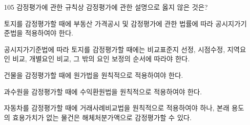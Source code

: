 \begin{question}{105}
감정평가에 관한 규칙상 감정평가에 관한 설명으로 옳지 않은 것은?
\begin{choices}
  \item 토지를 감정평가할 때에 부동산 가격공시 및 감정평가에 관한 법률에 따라 공시지가기준법을 적용하여야 한다.
  \item 공시지가기준법에 따라 토지를 감정평가할 때에는 비교표준지 선정, 시점수정, 지역요인 비교, 개별요인 비교, 그 밖의 요인 보정의 순서에 따라야 한다.
  \item 건물을 감정평가할 때에 원가법을 원칙적으로 적용하여야 한다.
  \item 과수원을 감정평가할 때에 수익환원법을 원칙적으로 적용하여야 한다.
  \item 자동차를 감정평가할 때에 거래사례비교법을 원칙적으로 적용하여야 하나, 본래 용도의 효용가치가 없는 물건은 해체처분가액으로 감정평가할 수 있다.
\end{choices}
\end{question}

